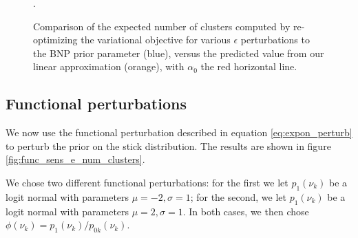 \documentclass[a4paper]{article}
\begin{document}
\begin{figure}[h!]
\begin{subfigure}[t]{0.32\textwidth}
	\end{subfigure}
	\caption{Comparison of the expected number of clusters computed by re-optimizing
  the variational objective for various $\epsilon$ perturbations to the BNP prior parameter
  (blue),
  versus the predicted value from our linear approximation (orange), with $\alpha_0$ the
  red horizontal line. }.
	\label{fig:parametric_sens_e_num_clusters}
\end{figure}



\subsection{Functional perturbations}
We now use the functional perturbation described in equation \ref{eq:expon_perturb}
to perturb the prior on the stick distribution.
The results are shown in figure \ref{fig:func_sens_e_num_clusters}.

We chose two different functional perturbations: for the first we let $p_1(\nu_k)$ be a
logit normal with parameters $\mu = -2, \sigma = 1$; for the second, we let
$p_1(\nu_k)$ be a
logit normal with parameters $\mu = 2, \sigma = 1$. In both cases, we then chose
$\phi(\nu_k) = p_1(\nu_k) / p_{0k}(\nu_k)$.
\end{document}
